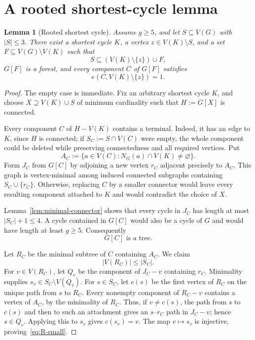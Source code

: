 \documentclass[11pt]{article}
\numberwithin{equation}{section}
\newtheorem{lemma}[theorem]{Lemma}
\theoremstyle{remark}
\begin{document}
\section{A rooted shortest-cycle lemma}

\begin{lemma}[Rooted shortest cycle]\label{lem:rooted-cycle}
Assume $g\ge5$, and let $S\subseteq V(G)$ with $|S|\le3$.  There exist a
shortest cycle $K$, a vertex $z\in V(K)\setminus S$, and a set
$F\subseteq V(G)\setminus V(K)$ such that
\[
 S\subseteq (V(K)\setminus\{z\})\cup F,
\]
$G[F]$ is a forest, and every component $C$ of $G[F]$ satisfies
\[
 e(C,V(K)\setminus\{z\})=1.
\]
\end{lemma}

\begin{proof}
The empty case is immediate.  Fix an arbitrary shortest cycle $K$, and
choose $X\supseteq V(K)\cup S$ of minimum cardinality such that
$H:=G[X]$ is connected.

Every component $C$ of $H-V(K)$ contains a terminal.  Indeed, it has an
edge to $K$, since $H$ is connected; if $S_C:=S\cap V(C)$ were empty, the
whole component could be deleted while preserving connectedness and all
required vertices.  Put
\[
 A_C:=\{a\in V(C):N_G(a)\cap V(K)\ne\varnothing\}.
\]
Form $J_C$ from $G[C]$ by adjoining a new vertex $r_C$ adjacent precisely
to $A_C$.  This graph is vertex-minimal among induced connected subgraphs
containing $S_C\cup\{r_C\}$.  Otherwise, replacing $C$ by a smaller
connector would leave every resulting component attached to $K$ and would
contradict the choice of $X$.

Lemma~\ref{lem:minimal-connector} shows that every cycle in $J_C$ has length
at most $|S_C|+1\le4$.  A cycle contained in $G[C]$ would also be a cycle of
$G$ and would have length at least $g\ge5$.  Consequently
\begin{equation}\label{eq:C-tree}
  G[C]\text{ is a tree}.
\end{equation}

Let $R_C$ be the minimal subtree of $C$ containing $A_C$.  We claim
\begin{equation}\label{eq:R-small}
  |V(R_C)|\le |S_C|.
\end{equation}
For $v\in V(R_C)$, let $Q_v$ be the component of $J_C-v$ containing $r_C$.
Minimality supplies $s_v\in S_C\setminus V(Q_v)$.  For $s\in S_C$, let
$c(s)$ be the first vertex of $R_C$ on the unique path from $s$ to $R_C$.
Every nonempty component of $R_C-v$ contains a vertex of $A_C$, by the
minimality of $R_C$.  Thus, if $v\ne c(s)$, the path from $s$ to $c(s)$ and
then to such an attachment gives an $s$--$r_C$ path in $J_C-v$; hence
$s\in Q_v$.  Applying this to $s_v$ gives $c(s_v)=v$.  The map
$v\mapsto s_v$ is injective, proving~\eqref{eq:R-small}.


\end{proof}
\end{document}
